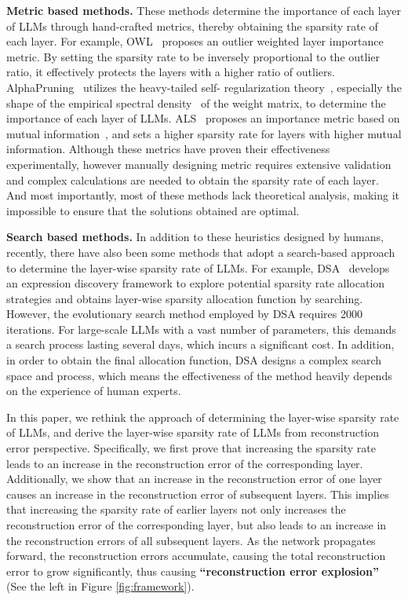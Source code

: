 \textbf{Metric based methods.} These methods determine the importance of each layer of LLMs through hand-crafted metrics, thereby obtaining the sparsity rate of each layer. For example, OWL~\cite{yin2023outlier} proposes an outlier weighted layer importance metric. By setting the sparsity rate to be inversely proportional to the outlier ratio, it effectively protects the layers with a higher ratio of outliers. AlphaPruning~\cite{lu2024alphapruning} utilizes the heavy-tailed self- regularization theory~\cite{martin2019traditional}, especially the shape of the empirical spectral density~\cite{martin2021predicting} of the weight matrix, to determine the importance of each layer of LLMs. ALS~\cite{li2024adaptive} proposes an importance metric based on mutual information~\cite{tschannen2019mutual}, and sets a higher sparsity rate for layers with higher mutual information. Although these metrics have proven their effectiveness experimentally, however manually designing metric requires extensive validation and complex calculations are needed to obtain the sparsity rate of each layer. And most importantly, most of these methods lack theoretical analysis, making it impossible to ensure that the solutions obtained are optimal.

\textbf{Search based methods.} In addition to these heuristics designed by humans, recently, there have also been some methods that adopt a search-based approach to determine the layer-wise sparsity rate of LLMs. For example, DSA~\cite{li2024discovering} develops an expression discovery framework to explore potential sparsity rate allocation strategies and obtains layer-wise sparsity allocation function by searching. However, the evolutionary search method employed by DSA requires 2000 iterations. For large-scale LLMs with a vast number of parameters, this demands a search process lasting several days, which incurs a significant cost. In addition, in order to obtain the final allocation function, DSA designs a complex search space and process, which means the effectiveness of the method heavily depends on the experience of human experts.

In this paper, we rethink the approach of determining the layer-wise sparsity rate of LLMs, and derive the layer-wise sparsity rate of LLMs from reconstruction error perspective. Specifically, we first prove that increasing the sparsity rate leads to an increase in the reconstruction error of the corresponding layer. Additionally, we show that an increase in the reconstruction error of one layer causes an increase in the reconstruction error of subsequent layers. This implies that increasing the sparsity rate of earlier layers not only increases the reconstruction error of the corresponding layer, but also leads to an increase in the reconstruction errors of all subsequent layers. As the network propagates forward, the reconstruction errors accumulate, causing the total reconstruction error to grow significantly, thus causing \textbf{``reconstruction error explosion''} (See the left in Figure \ref{fig:framework}).

